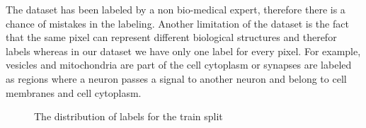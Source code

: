 \documentclass[twocolumn, a4paper]{article}
\theoremstyle{definition}
\begin{document}
The dataset has been labeled by a non bio-medical expert, therefore there is a chance of mistakes
in the labeling. Another limitation of the dataset is the fact that the same pixel can represent
different biological structures and therefor labels whereas in our dataset we have only one label for
every pixel. For example, vesicles and mitochondria are part of the cell cytoplasm or
synapses are labeled as regions where a neuron passes a signal to another neuron and belong
to cell membranes and cell cytoplasm.

\begin{figure}[ht]
    \centering
    \caption{The distribution of labels for the train split}
    \label{fig:dist_labels}
\end{figure}
\end{document}
